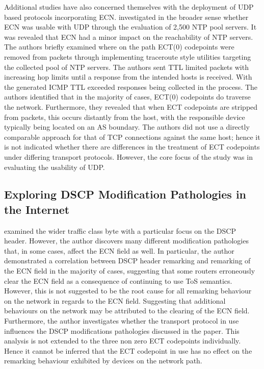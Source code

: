 \documentclass{l4proj}
\begin{document}
Additional studies have also concerned themselves with the deployment of UDP based protocols incorporating ECN. \cite{mcquistin_is_2015} investigated in the broader sense whether ECN was usable with UDP through the evaluation of 2,500 NTP pool servers. It was revealed that ECN had a minor impact on the reachability of NTP servers. The authors briefly examined where on the path ECT(0) codepoints were removed from packets through implementing traceroute style utilities targeting the collected pool of NTP servers. The authors sent TTL limited packets with increasing hop limits until a response from the intended hosts is received. With the generated ICMP TTL exceeded responses being collected in the process. The authors identified that in the majority of cases, ECT(0) codepoints do traverse the network. Furthermore, they revealed that when ECT codepoints are stripped from packets, this occurs distantly from the host, with the responsible device typically being located on an AS boundary. The authors did not use a directly comparable approach for that of TCP connections against the same host; hence it is not indicated whether there are differences in the treatment of ECT codepoints under differing transport protocols. However, the core focus of the study was in evaluating the usability of UDP.

\subsection{Exploring DSCP Modification Pathologies in the Internet}

\cite{custura_exploring_2017} examined the wider traffic class byte with a particular focus on the DSCP header. However, the author discovers many different modification pathologies that, in some cases, affect the ECN field as well. In particular, the author demonstrated a correlation between DSCP header remarking and remarking of the ECN field in the majority of cases, suggesting that some routers erroneously clear the ECN field as a consequence of continuing to use ToS semantics. However, this is not suggested to be the root cause for all remarking behaviour on the network in regards to the ECN field. Suggesting that additional behaviours on the network may be attributed to the clearing of the ECN field. Furthermore, the author investigates whether the transport protocol in use influences the DSCP modifications pathologies discussed in the paper. This analysis is not extended to the three non zero ECT codepoints individually. Hence it cannot be inferred that the ECT codepoint in use has no effect on the remarking behaviour exhibited by devices on the network path.
\end{document}
